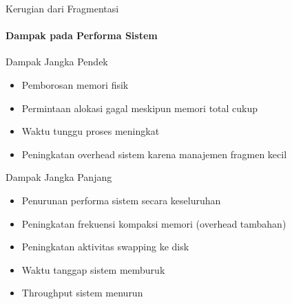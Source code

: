 \documentclass[10pt,aspectratio=169]{beamer}
\begin{document}
\begin{frame}{Kerugian dari Fragmentasi}
    \framesubtitle{Dampak pada Performa Sistem}
    
    \begin{block}{Dampak Jangka Pendek}
        \begin{itemize}
            \item Pemborosan memori fisik
            \item Permintaan alokasi gagal meskipun memori total cukup
            \item Waktu tunggu proses meningkat
            \item Peningkatan overhead sistem karena manajemen fragmen kecil
        \end{itemize}
    \end{block}
    
    \begin{alertblock}{Dampak Jangka Panjang}
        \begin{itemize}
            \item Penurunan performa sistem secara keseluruhan
            \item Peningkatan frekuensi kompaksi memori (overhead tambahan)
            \item Peningkatan aktivitas swapping ke disk
            \item Waktu tanggap sistem memburuk
            \item Throughput sistem menurun
        \end{itemize}
    \end{alertblock}
\end{frame}
\end{document}
